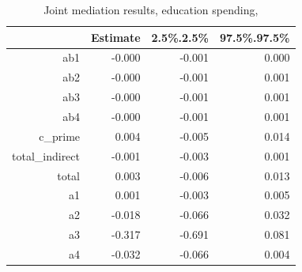 \begin{table}[ht]
\centering
\begin{tabular}{rrrr}
  \hline
 & Estimate & 2.5\%.2.5\% & 97.5\%.97.5\% \\ 
  \hline
ab1 & -0.000 & -0.001 & 0.000 \\ 
  ab2 & -0.000 & -0.001 & 0.001 \\ 
  ab3 & -0.000 & -0.001 & 0.001 \\ 
  ab4 & -0.000 & -0.001 & 0.001 \\ 
  c\_prime & 0.004 & -0.005 & 0.014 \\ 
  total\_indirect & -0.001 & -0.003 & 0.001 \\ 
  total & 0.003 & -0.006 & 0.013 \\ 
  a1 & 0.001 & -0.003 & 0.005 \\ 
  a2 & -0.018 & -0.066 & 0.032 \\ 
  a3 & -0.317 & -0.691 & 0.081 \\ 
  a4 & -0.032 & -0.066 & 0.004 \\ 
   \hline
\end{tabular}
\caption{Joint mediation results, education spending,} 
\end{table}
